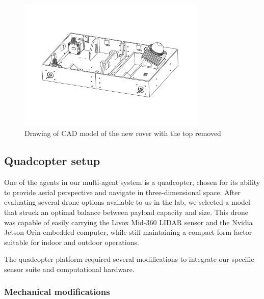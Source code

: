 \documentclass[12pt]{article}
\begin{document}
        \begin{figure}[H]
            \centering
            \includegraphics[width=0.8\textwidth]{Images/roverv2.pdf}
            \caption{Drawing of CAD model of the new rover with the top removed}
            \label{fig:crawlerv2_cad}
        \end{figure}


    \subsection{Quadcopter setup}
            

            One of the agents in our multi-agent system is a quadcopter, chosen for its ability to provide aerial perspective and navigate in three-dimensional space. After evaluating several drone options available to us in the lab, we selected a model that struck an optimal balance between payload capacity and size. This drone was capable of easily carrying the Livox Mid-360 LIDAR sensor and the Nvidia Jetson Orin embedded computer, while still maintaining a compact form factor suitable for indoor and outdoor operations.

            The quadcopter platform required several modifications to integrate our specific sensor suite and computational hardware.

            \subsubsection{Mechanical modifications}
\end{document}
